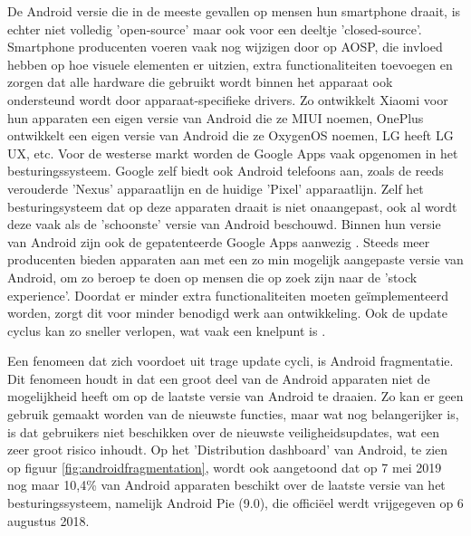 De Android versie die in de meeste gevallen op mensen hun smartphone draait, is echter niet volledig 'open-source' maar ook voor een deeltje 'closed-source'. Smartphone producenten voeren vaak nog wijzigen door op AOSP, die invloed hebben op hoe visuele elementen er uitzien, extra functionaliteiten toevoegen en zorgen dat alle hardware die gebruikt wordt binnen het apparaat ook ondersteund wordt door apparaat-specifieke drivers. Zo ontwikkelt Xiaomi voor hun apparaten een eigen versie van Android die ze MIUI noemen, OnePlus ontwikkelt een eigen versie van Android die ze OxygenOS noemen, LG heeft LG UX, etc. Voor de westerse markt worden de Google Apps vaak opgenomen in het besturingssysteem. Google zelf biedt ook Android telefoons aan, zoals de reeds verouderde 'Nexus' apparaatlijn en de huidige 'Pixel' apparaatlijn. Zelf het besturingsysteem dat op deze apparaten draait is niet onaangepast, ook al wordt deze vaak als de 'schoonste' versie van Android beschouwd. Binnen hun versie van Android zijn ook de gepatenteerde Google Apps aanwezig \autocite{torres_stockandroid}. Steeds meer producenten bieden apparaten aan met een zo min mogelijk aangepaste versie van Android, om zo beroep te doen op mensen die op zoek zijn naar de 'stock experience'. Doordat er minder extra functionaliteiten moeten geïmplementeerd worden, zorgt dit voor minder benodigd werk aan ontwikkeling. Ook de update cyclus kan zo sneller verlopen, wat vaak een knelpunt is \autocite{manik_slow-updates}. 

Een fenomeen dat zich voordoet uit trage update cycli, is Android fragmentatie.
Dit fenomeen houdt in dat een groot deel van de Android apparaten niet de mogelijkheid heeft om op de laatste versie van Android te draaien. Zo kan er geen gebruik gemaakt worden van de nieuwste functies, maar wat nog belangerijker is, is dat gebruikers niet beschikken over de nieuwste veiligheidsupdates, wat een zeer groot risico inhoudt. Op het 'Distribution dashboard' van Android, te zien op figuur \ref{fig:androidfragmentation}, wordt ook aangetoond dat op 7 mei 2019 nog maar 10,4\% van Android apparaten beschikt over de laatste versie van het besturingssysteem, namelijk Android Pie (9.0), die officiëel werdt vrijgegeven op 6 augustus 2018.

